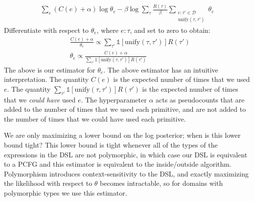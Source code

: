 \documentclass{article}
\newcommand{\indicator}{\mathds{1}} %
\begin{document}
\begin{align}
\sum_e (C(e) + \alpha)\log \theta_e  - \beta\log \sum_\tau\frac{R(\tau)}{\beta}\sum_{\substack{e:\tau'\in \mathcal{D}\\\text{unify}(\tau,\tau')}}\theta_e    
\end{align}
Differentiate with respect to $\theta_e$, where $e:\tau$, and set to zero to obtain:
\begin{align}
  &  \frac{C(e) + \alpha}{\theta_e}\propto\sum_{\tau'}\indicator\left[\text{unify}(\tau,\tau') \right] R(\tau')\\
&  \theta_e\propto\frac{C(e) + \alpha}{\sum_{\tau'}\indicator\left[\text{unify}(\tau,\tau') \right] R(\tau')}
\end{align}
The above is our estimator for $\theta_e$.
The above estimator has an intuitive interpretation.
The quantity $C(e)$ is the expected number of times that we used $e$.
The quantity $\sum_{\tau'}\indicator\left[\text{unify}(\tau,\tau') \right] R(\tau')$
is the expected number of times that we \emph{could have} used $e$.
The hyperparameter $\alpha$ acts as pseudocounts that are
added to the number of times that we used each primitive,
and are not added to the number of times that we could have used each primitive.


We are only maximizing a lower bound on the log posterior; when is this lower bound tight?
This lower bound is tight whenever all
of the types of the expressions in the DSL are not polymorphic, in which case our DSL is equivalent to a PCFG
and this estimator is equivalent to the inside/outside algorithm.
Polymorphism introduces context-sensitivity to the DSL,
and exactly maximizing the likelihood with respect to $\theta$
becomes intractable,
so for domains with polymorphic types we use this estimator.
\end{document}
